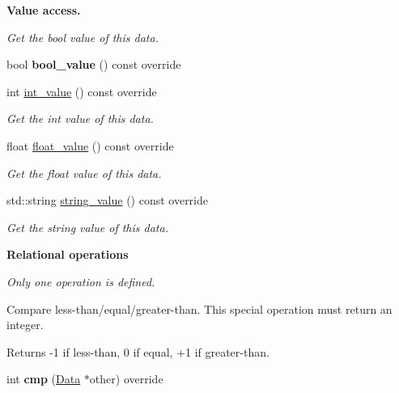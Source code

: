 \begin{Indent}{\bf Value access.}\par
{\em Get the bool value of this data. }\begin{DoxyCompactItemize}
\item 
bool {\bfseries bool\+\_\+value} () const  override\hypertarget{classcreek_1_1_identifier_a096dc15e25a158dac3876424e432f9e3}{}\label{classcreek_1_1_identifier_a096dc15e25a158dac3876424e432f9e3}

\item 
int \hyperlink{classcreek_1_1_identifier_ad65a3d9a61c95ca78a447703a6f822c7}{int\+\_\+value} () const  override\hypertarget{classcreek_1_1_identifier_ad65a3d9a61c95ca78a447703a6f822c7}{}\label{classcreek_1_1_identifier_ad65a3d9a61c95ca78a447703a6f822c7}

\begin{DoxyCompactList}\small\item\em Get the int value of this data. \end{DoxyCompactList}\item 
float \hyperlink{classcreek_1_1_identifier_a49832ed17b3c1c91d70931bfa7a86dd5}{float\+\_\+value} () const  override\hypertarget{classcreek_1_1_identifier_a49832ed17b3c1c91d70931bfa7a86dd5}{}\label{classcreek_1_1_identifier_a49832ed17b3c1c91d70931bfa7a86dd5}

\begin{DoxyCompactList}\small\item\em Get the float value of this data. \end{DoxyCompactList}\item 
std\+::string \hyperlink{classcreek_1_1_identifier_acfae2629e9ff5445cac5d667b67ce65c}{string\+\_\+value} () const  override\hypertarget{classcreek_1_1_identifier_acfae2629e9ff5445cac5d667b67ce65c}{}\label{classcreek_1_1_identifier_acfae2629e9ff5445cac5d667b67ce65c}

\begin{DoxyCompactList}\small\item\em Get the string value of this data. \end{DoxyCompactList}\end{DoxyCompactItemize}
\end{Indent}
\begin{Indent}{\bf Relational operations}\par
{\em Only one operation is defined.

Compare less-\/than/equal/greater-\/than. This special operation must return an integer. \begin{DoxyReturn}{Returns}
-\/1 if less-\/than, 0 if equal, +1 if greater-\/than. 
\end{DoxyReturn}
}\begin{DoxyCompactItemize}
\item 
int {\bfseries cmp} (\hyperlink{classcreek_1_1_data}{Data} $\ast$other) override\hypertarget{classcreek_1_1_identifier_aab1538bdde16632cb788feccfb44b3fb}{}\label{classcreek_1_1_identifier_aab1538bdde16632cb788feccfb44b3fb}

\end{DoxyCompactItemize}
\end{Indent}


